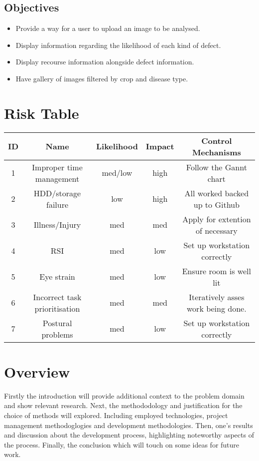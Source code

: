   \subsection{Objectives}
    \begin{itemize}
      \item Provide a way for a user to upload an image to be analysed.
      \item Display information regarding the likelihood of each kind of defect.
      \item Display recourse information alongside defect information.
      \item Have gallery of images filtered by crop and disease type.
    \end{itemize}

  \section{Risk Table}
  \begin{tabular}{|c|c|c|c|c|}
  \hline
  ID & Name & Likelihood & Impact & Control Mechanisms\tabularnewline
  \hline
  \hline
  1 & Improper time management & med/low & high & Follow the Gannt chart\tabularnewline
  \hline
  2 & HDD/storage failure & low & high & All worked backed up to Github\tabularnewline
  \hline
  3 & Illness/Injury & med & med & Apply for extention of necessary\tabularnewline
  \hline
  4 & RSI & med & low & Set up workstation correctly\tabularnewline
  \hline
  5 & Eye strain & med & low & Ensure room is well lit\tabularnewline
  \hline
  6 & Incorrect task prioritisation & med & med & Iteratively asses work being done.\tabularnewline
  \hline
  7 & Postural problems & med & low & Set up workstation correctly\tabularnewline
  \hline
  \end{tabular}


\section{Overview}
  Firstly the introduction will provide additional context to the problem domain and show relevant research. Next, the methododology and justification for the choice of methods will explored. Including employed technologies, project management methodoglogies and development methodologies. Then, one's results and discussion about the development process, highlighting noteworthy aspects of the process. Finally, the conclusion which will touch on some ideas for future work.  
